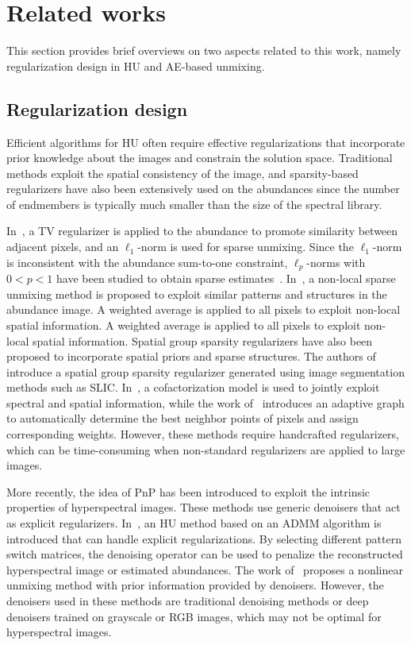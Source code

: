 \documentclass[journal,a4paper]{IEEEtran}
\begin{document}
\section{Related works}
\label{sec:related_work}
This section provides brief overviews on two aspects related to this work, namely regularization design in HU and AE-based unmixing.

\subsection{Regularization design}

Efficient algorithms for HU often require effective regularizations that incorporate prior knowledge about the images and constrain the solution space. Traditional methods exploit the spatial consistency of the image, and sparsity-based regularizers have also been extensively used on the abundances since the number of endmembers is typically much smaller than the size of the spectral library.

In~\cite{iordache2012total}, a TV regularizer is applied to the abundance to promote similarity between adjacent pixels, and an $\ell_1$-norm is used for sparse unmixing. Since the $\ell_1$-norm is inconsistent with the abundance sum-to-one constraint, $\ell_p$-norms with $0<p<1$ have been studied to obtain sparse estimates~\cite{sigurdsson2014hyperspectral}. In~\cite{zhong2013non}, a non-local sparse unmixing method is proposed to exploit similar patterns and structures in the abundance image. A weighted average is applied to all pixels to exploit non-local spatial information. A weighted average is applied to all pixels to exploit non-local spatial information. Spatial group sparsity regularizers have also been proposed to incorporate spatial priors and sparse structures. The authors of~\cite{wang2017spatial} introduce a spatial group sparsity regularizer generated using image segmentation methods such as SLIC. In~\cite{lagrange2020matrix}, a cofactorization model is used to jointly exploit spectral and spatial information, while the work of~\cite{tong2020adaptive} introduces an adaptive graph to automatically determine the best neighbor points of pixels and assign corresponding weights.  However, these methods require handcrafted regularizers, which can be time-consuming when non-standard regularizers are applied to large images.

More recently, the idea of PnP has been introduced to exploit the intrinsic properties of hyperspectral images. These methods use generic denoisers that act as explicit regularizers. In~\cite{zhao2021plug}, an HU method based on an ADMM algorithm is introduced that can handle explicit regularizations. By selecting different pattern switch matrices, the denoising operator can be used to penalize the reconstructed hyperspectral image or estimated abundances. The work of~\cite{wang2020hyperspectral} proposes a nonlinear unmixing method with prior information provided by denoisers. However, the denoisers used in these methods are traditional denoising methods or deep denoisers trained on grayscale or RGB images, which may not be optimal for hyperspectral images.
\end{document}
